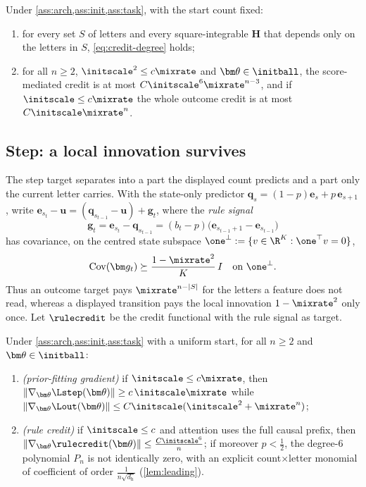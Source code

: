 \begin{theorem}
\label{thm:main}
Under \cref{ass:arch,ass:init,ass:task}, with the start count fixed:
\begin{enumerate}[label=(\roman*),leftmargin=*,itemsep=0pt,topsep=2pt]
\item for every set $S$ of letters and every square-integrable $\mathbf H$ that depends only on the letters in $S$, \cref{eq:credit-degree} holds;
\item for all $n\ge2$, $\initscale^2\le c\mixrate$ and $\bm\theta\in\initball$, the score-mediated credit is at most $C\initscale^6\mixrate^{n-3}$, and if
$\initscale\le c\mixrate$ the whole outcome credit is at most $C\initscale\mixrate^n$.
\end{enumerate}
\end{theorem}

\subsection{Step: a local innovation survives}
The step target separates into a part the displayed count predicts and a part only the current letter carries. With the
state-only predictor $\bm q_s=(1-p)\bm e_s+p\,\bm e_{s+1}$, write $\bm e_{s_t}-\bm u=(\bm q_{s_{t-1}}-\bm u)+\bm g_t$, where the
\emph{rule signal}
\[
 \bm g_t=\bm e_{s_t}-\bm q_{s_{t-1}}=(b_t-p)\bigl(\bm e_{s_{t-1}+1}-\bm e_{s_{t-1}}\bigr)
\]
has covariance, on the centred state subspace $\one^\perp:=\{v\in\R^K:\one^\top v=0\}$,
\begin{equation}
 \operatorname{Cov}(\bm g_t)\succeq\frac{1-\mixrate^2}{K}\,I
 \quad\text{on }\one^\perp.
 \label{eq:local-variation}
\end{equation}
Thus an outcome target pays $\mixrate^{n-|S|}$ for the letters a feature does not read, whereas a displayed transition pays the
local innovation $1-\mixrate^2$ only once. Let $\rulecredit$ be the credit
functional with the rule signal as target.

\begin{theorem}
\label{thm:separation}
Under \cref{ass:arch,ass:init,ass:task} with a uniform start, for all $n\ge2$ and $\bm\theta\in\initball$:
\begin{enumerate}[label=(\roman*),leftmargin=*,itemsep=0pt,topsep=2pt]
\item \emph{(prior-fitting gradient)} if $\initscale\le c\mixrate$, then $\|\nabla_{\bm\theta}\Lstep(\bm\theta)\|\ge c\,\initscale\mixrate$ while
$\|\nabla_{\bm\theta}\Lout(\bm\theta)\|\le C\initscale(\initscale^2+\mixrate^n)$;
\item \emph{(rule credit)} if $\initscale\le c$ and attention uses the full causal prefix, then $\|\nabla_{\bm\theta}\rulecredit(\bm\theta)\|\le \frac{C\initscale^6}{n}$; if
moreover $p<\tfrac{1}{2}$, the degree-$6$ polynomial $P_n$ is not identically zero, with an explicit count$\times$letter monomial of
coefficient of order $\frac{1}{n\sqrt{d_{\mathrm h}}}$
(\cref{lem:leading}).
\end{enumerate}
\end{theorem}

